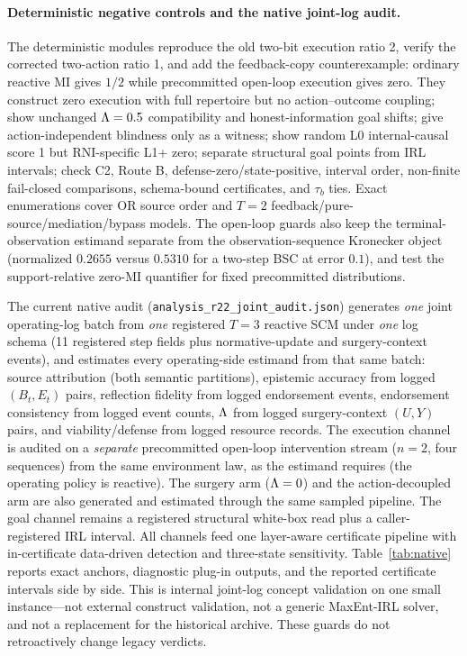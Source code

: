 \paragraph{Deterministic negative controls and the native joint-log audit.}
The deterministic modules reproduce the old two-bit execution ratio 2, verify
the corrected two-action ratio 1, and add the feedback-copy counterexample:
ordinary reactive MI gives $1/2$ while precommitted open-loop execution gives
zero. They construct zero execution with full repertoire but no action--outcome
coupling; show unchanged $\Lambda=0.5$ compatibility and honest-information goal
shifts; give action-independent blindness only as a witness; show random L0
internal-causal score 1 but RNI-specific L1+ zero; separate structural goal
points from IRL intervals; check C2, Route B, defense-zero/state-positive,
interval order, non-finite fail-closed comparisons, schema-bound certificates,
and $\tau_b$ ties. Exact enumerations cover OR source order and $T=2$
feedback/pure-source/mediation/bypass models. The open-loop guards also keep
the terminal-observation estimand separate from the observation-sequence
Kronecker object (normalized $0.2655$ versus $0.5310$ for a two-step BSC at
error $0.1$), and test the support-relative zero-MI quantifier for fixed
precommitted distributions.

The current native audit
(\texttt{analysis\_r22\_joint\_audit.json}) generates \emph{one} joint
operating-log batch from \emph{one} registered $T=3$ reactive SCM under
\emph{one} log schema (11 registered step fields plus normative-update and
surgery-context events), and estimates every operating-side estimand from
that same batch: source attribution (both semantic partitions), epistemic
accuracy from logged $(B_t,E_t)$ pairs, reflection fidelity from logged
endorsement events, endorsement consistency from logged event counts, $\Lambda$
from logged surgery-context $(U,Y)$ pairs, and viability/defense from logged
resource records. The execution channel is audited on a \emph{separate}
precommitted open-loop intervention stream ($n=2$, four sequences) from the
same environment law, as the estimand requires (the operating policy is
reactive). The surgery arm ($\Lambda=0$) and the action-decoupled arm are also
generated and estimated through the same sampled pipeline. The goal channel
remains a registered structural white-box read plus a caller-registered IRL
interval. All channels feed one layer-aware certificate pipeline with
in-certificate data-driven detection and three-state sensitivity.
Table~\ref{tab:native} reports exact anchors, diagnostic plug-in outputs, and
the reported certificate intervals side by side. This is internal joint-log
concept validation on one small instance---not external construct validation,
not a generic MaxEnt-IRL solver, and not a replacement for the historical
archive. These guards do not retroactively change legacy verdicts.

